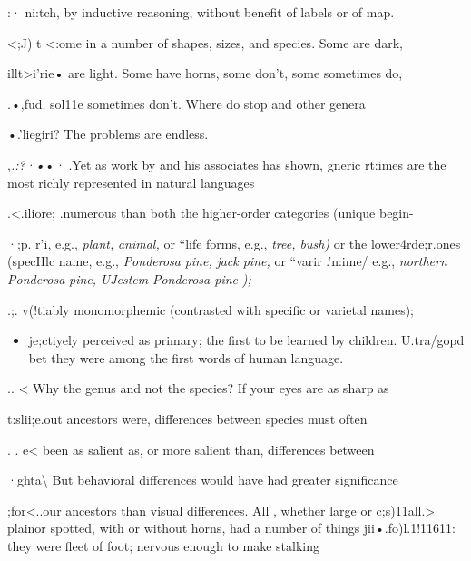 :· ni:tch, by inductive reasoning, without benefit of labels or of map.

{\textless};J) t {\textless}:ome in a number of shapes, sizes, and species. Some are dark,

illt{\textgreater}i'rie• are light. Some have horns, some don't, some sometimes do,

.•,fud. sol11e sometimes don't. Where do  stop and other genera

•.'liegiri? The problems are endless.

,\textit{.}\textit{:}\textit{?}\textit{·•}•\textit{· }.Yet as work by \citet{Berlin1972} and his associates has shown, gneric rt:imes are the most richly represented in natural languages\-

.{\textless}.iliore; .numerous than both the higher-order categories ({\textquotedbl}unique begin-

·;p. r'i, e.g., \textit{plant,} \textit{animal,} or ``life forms, e.g., \textit{tree, bus}\textit{h}\textit{)} or the lower\-4rde;r.ones ({\textquotedbl}specHlc name, e.g., \textit{Ponderosa} \textit{pine,} \textit{jack pine, }or ``vari\-r .'n:ime/ e.g., \textit{northern} \textit{Ponderosa} \textit{pine, }\textit{UJ}\textit{estem} \textit{Ponderosa pine} \textit{);}

.;. v(!tiably monomorphemic (contrasted with specific or varietal names);

\begin{itemize}
\item je;ctiyely perceived as primary; the first to be learned by children. U.tr{\textquotedbl}a/gopd bet they were among the first words of human language.
\end{itemize}

.. {\textless} Why the genus and not the species? If your eyes are as sharp as

t:slii;e.out ancestors were, differences between species must often

. . e{\textless} been as salient as, or more salient than, differences between

·ghta{\textbackslash} But behavioral differences would have had greater significance

;for{\textless}..our ancestors than visual differences. All , whether large or c;s)11all.{\textgreater} plainor spotted, with or without horns, had a number of things jii•.fo)l.1!11611: they were fleet of foot; nervous enough to make stalking

